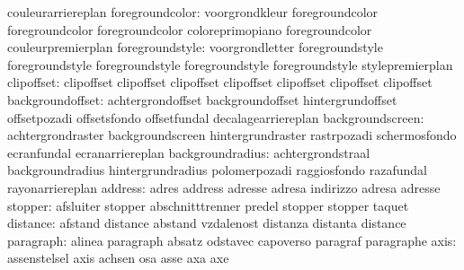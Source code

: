                            couleurarriereplan
          foregroundcolor: voorgrondkleur            foregroundcolor
                           foregroundcolor           foregroundcolor
                           coloreprimopiano          foregroundcolor
                           couleurpremierplan
          foregroundstyle: voorgrondletter           foregroundstyle
                           foregroundstyle           foregroundstyle
                           foregroundstyle           foregroundstyle
                           stylepremierplan
               clipoffset: clipoffset                clipoffset
                           clipoffset                clipoffset
                           clipoffset                clipoffset
                           clipoffset
         backgroundoffset: achtergrondoffset         backgroundoffset
                           hintergrundoffset         offsetpozadi
                           offsetsfondo              offsetfundal
                           decalagearriereplan
         backgroundscreen: achtergrondraster         backgroundscreen
                           hintergrundraster         rastrpozadi
                           schermosfondo             ecranfundal
                           ecranarriereplan
         backgroundradius: achtergrondstraal         backgroundradius
                           hintergrundradius         polomerpozadi
                           raggiosfondo              razafundal
                           rayonarriereplan
                  address: adres                     address
                           adresse                   adresa
                           indirizzo                 adresa
                           adresse
                  stopper: afsluiter                 stopper
                           abschnitttrenner          predel
                           stopper                   stopper
                           taquet
                 distance: afstand                   distance
                           abstand                   vzdalenost
                           distanza                  distanta
                           distance
                paragraph: alinea                    paragraph
                           absatz                    odstavec
                           capoverso                 paragraf
                           paragraphe
                     axis: assenstelsel              axis
                           achsen                    osa
                           asse                      axa
                           axe
